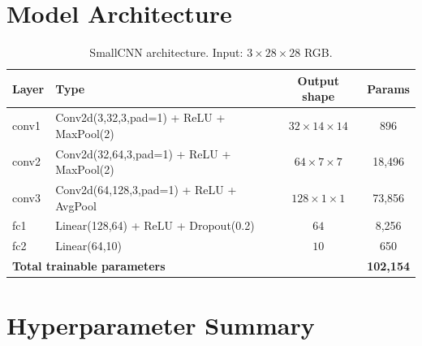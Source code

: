 \documentclass{article}
\begin{document}



\appendix

\section{Model Architecture}
\label{app:arch}

\begin{table}[h]
\centering
\caption{SmallCNN architecture. Input: $3 \times 28 \times 28$ RGB.}
\label{tab:arch}
\small
\begin{tabular}{llcc}
\toprule
\textbf{Layer} & \textbf{Type} & \textbf{Output shape} & \textbf{Params} \\
\midrule
conv1  & Conv2d(3,32,3,pad=1) + ReLU + MaxPool(2)  & $32\times14\times14$ & 896      \\
conv2  & Conv2d(32,64,3,pad=1) + ReLU + MaxPool(2) & $64\times7\times7$   & 18{,}496 \\
conv3  & Conv2d(64,128,3,pad=1) + ReLU + AvgPool   & $128\times1\times1$  & 73{,}856 \\
fc1    & Linear(128,64) + ReLU + Dropout(0.2)       & $64$                 & 8{,}256  \\
fc2    & Linear(64,10)                               & $10$                 & 650      \\
\midrule
\multicolumn{3}{l}{\textbf{Total trainable parameters}} & \textbf{102{,}154} \\
\bottomrule
\end{tabular}
\end{table}

\section{Hyperparameter Summary}
\label{app:hyperparams}
\end{document}
